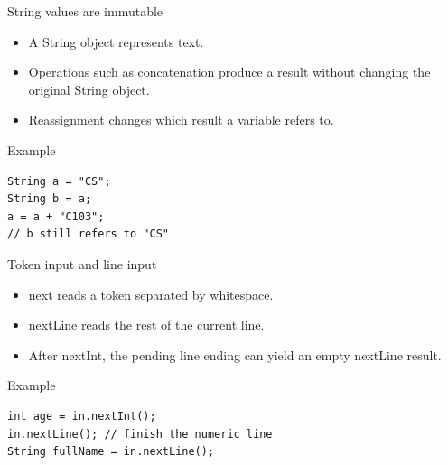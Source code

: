 \documentclass[10pt,aspectratio=169]{beamer}
\begin{document}
\begin{frame}[fragile,t]{String values are immutable}
\begin{itemize}
\item A String object represents text.
\item Operations such as concatenation produce a result without changing the original String object.
\item Reassignment changes which result a variable refers to.
\end{itemize}
\vspace{1mm}\begin{block}{Example}
\begin{lstlisting}
String a = "CS";
String b = a;
a = a + "C103";
// b still refers to "CS"
\end{lstlisting}
\end{block}
\end{frame}

\begin{frame}[fragile,t]{Token input and line input}
\begin{itemize}
\item next reads a token separated by whitespace.
\item nextLine reads the rest of the current line.
\item After nextInt, the pending line ending can yield an empty nextLine result.
\end{itemize}
\vspace{1mm}\begin{block}{Example}
\begin{lstlisting}
int age = in.nextInt();
in.nextLine(); // finish the numeric line
String fullName = in.nextLine();
\end{lstlisting}
\end{block}
\end{frame}
\end{document}

